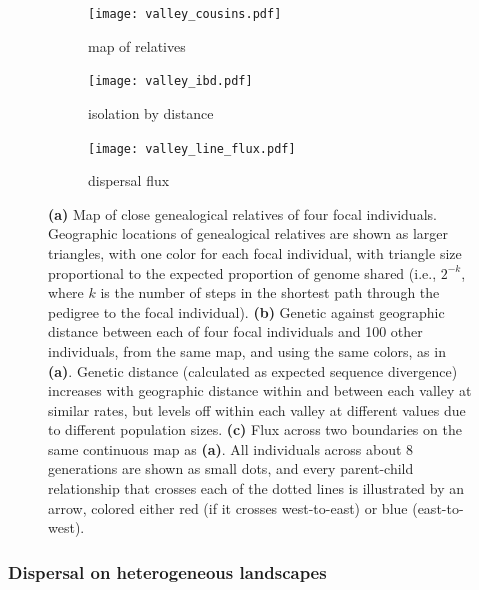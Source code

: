 \documentclass{ar-1col}
\begin{document}
\begin{figure}	%
    \centering
    \begin{subfigure}{0.8\textwidth}
        \centering
        \texttt{[image: valley\_cousins.pdf]}
        \caption{map of relatives}
        \label{cousin_map}
    \end{subfigure}
    \begin{subfigure}{0.7\textwidth}
        \centering
        \texttt{[image: valley\_ibd.pdf]}
        \caption{isolation by distance}
        \label{ibd}
    \end{subfigure}
    \begin{subfigure}{0.8\textwidth}
        \centering
        \texttt{[image: valley\_line\_flux.pdf]}
        \caption{dispersal flux}
        \label{valleyflux}
    \end{subfigure}
        \caption{
            \textbf{(a)} Map of close genealogical relatives of four focal individuals.
            Geographic locations of 
            genealogical relatives are shown as larger triangles, with one color for each focal individual,
            with triangle size proportional to the expected proportion of genome shared
            (i.e., $2^{-k}$, where $k$ is the number of steps in the shortest path through the pedigree to the focal individual).
            \textbf{(b)}
            Genetic against geographic distance between each of four focal individuals
            and 100 other individuals, 
            from the same map, and using the same colors, as in \textbf{(a)}.
            Genetic distance (calculated as expected sequence divergence)
            increases with geographic distance within and between each valley at similar rates,
            but levels off within each valley at different values
            due to different population sizes.
            \textbf{(c)}
            Flux across two boundaries on the same continuous map as \textbf{(a)}.
            All individuals across about 8 generations are shown as small dots,
            and every parent-child relationship that crosses each of the dotted lines
            is illustrated by an arrow, colored either red (if it crosses west-to-east) or blue (east-to-west).
        }
        \label{fig:dispersal}
\end{figure}

\subsubsection{Dispersal on heterogeneous landscapes}
\end{document}
